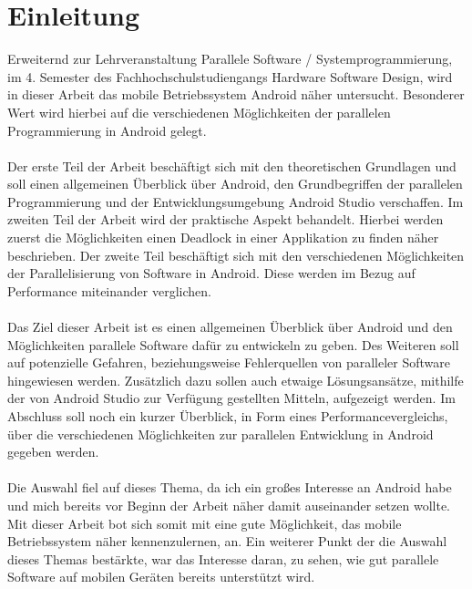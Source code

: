 \chapter[Einleitung] {Einleitung}       
\label{cha:einleitung}

Erweiternd zur Lehrveranstaltung Parallele Software / Systemprogrammierung, im 4. Semester des Fachhochschulstudiengangs Hardware Software Design, wird in dieser Arbeit das mobile Betriebssystem Android näher untersucht. Besonderer Wert wird hierbei auf die verschiedenen Möglichkeiten der parallelen Programmierung in Android gelegt.
\\
\\
Der erste Teil der Arbeit beschäftigt sich mit den theoretischen Grundlagen und soll einen allgemeinen Überblick über Android, den Grundbegriffen der parallelen Programmierung und der Entwicklungsumgebung Android Studio verschaffen. Im zweiten Teil der Arbeit wird der praktische Aspekt behandelt. Hierbei werden zuerst die Möglichkeiten einen Deadlock in einer Applikation zu finden näher beschrieben. Der zweite Teil beschäftigt sich mit den verschiedenen Möglichkeiten der Parallelisierung von Software in Android. Diese werden im Bezug auf Performance miteinander verglichen.
\\
\\
Das Ziel dieser Arbeit ist es einen allgemeinen Überblick über Android und den Möglichkeiten parallele Software dafür zu entwickeln zu geben. Des Weiteren soll auf potenzielle Gefahren, beziehungsweise Fehlerquellen von paralleler Software hingewiesen werden. Zusätzlich dazu sollen auch etwaige Lösungsansätze, mithilfe der von Android Studio zur Verfügung gestellten Mitteln, aufgezeigt werden. Im Abschluss soll noch ein kurzer Überblick, in Form eines Performancevergleichs, über die verschiedenen Möglichkeiten zur parallelen Entwicklung in Android gegeben werden.
\\
\\
Die Auswahl fiel auf dieses Thema, da ich ein großes Interesse an Android habe und mich bereits vor Beginn der Arbeit näher damit auseinander setzen wollte. Mit dieser Arbeit bot sich somit mit eine gute Möglichkeit, das mobile Betriebssystem näher kennenzulernen, an. Ein weiterer Punkt der die Auswahl dieses Themas bestärkte, war das Interesse daran, zu sehen, wie gut parallele Software auf mobilen Geräten bereits unterstützt wird.